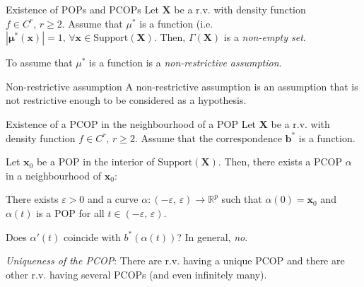 \begin{theorem}{Existence of POPs and PCOPs}{}
	Let $\boldsymbol X$ be a r.v. with density function $f \in C^r,\, r \geq 2$.
	Assume that $\mu^*$ is a function (i.e. $|\boldsymbol \mu^*(\boldsymbol x)| = 1,\,\forall
		\boldsymbol x \in \text{Support}(\boldsymbol X)$. Then, $\Gamma(\boldsymbol X)$ is a
        \emph{non-empty set}.
	\tcblower
	\begin{note}
        To assume that $\mu^*$ is a function is a \emph{non-restrictive assumption}.
	\end{note}
\end{theorem}

\begin{definition}{Non-restrictive assumption}{}
	A non-restrictive assumption is an assumption that is not restrictive enough to
	be considered as a hypothesis.
\end{definition}

\begin{theorem}{Existence of a PCOP in the neighbourhood of a POP}{}
	Let $\boldsymbol X$ be a r.v. with density function $f \in C^r,\, r \geq 2$.
	Assume that the correspondence $\boldsymbol b^*$ is a function.

	Let $\boldsymbol x_0$ be a POP in the interior of $\text{Support}(\boldsymbol X)$.
	Then, there exists a PCOP $\alpha$ in a neighbourhood of $\boldsymbol x_0$:

	There exists $\varepsilon > 0$ and a curve $\alpha : (-\varepsilon,\, \varepsilon) \to \mathds{R}^p$
	such that $\alpha(0) = \boldsymbol x_0$ and $\alpha(t)$ is a POP for all $t \in (-\varepsilon,\, \varepsilon)$.

	\tcblower

	\begin{question}{Does $\alpha'(t)$ coincide with $b^*(\alpha(t))$?}{}
		In general, \emph{no}.
	\end{question}

	\begin{note}
		\emph{Uniqueness of the PCOP}: There are r.v. having a unique PCOP and there
		are other r.v. having several PCOPs (and even infinitely many).
	\end{note}
\end{theorem}


